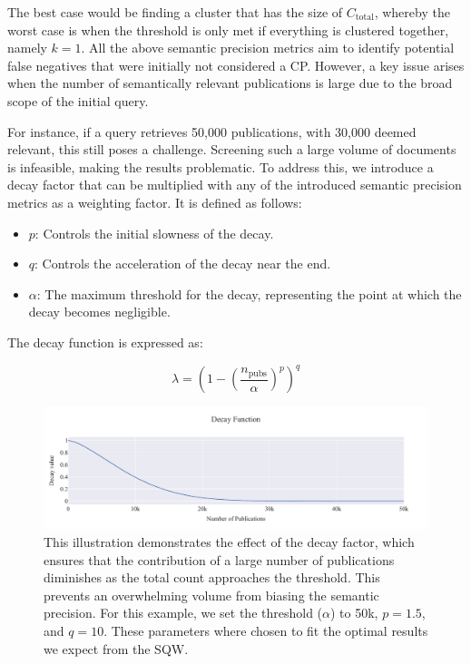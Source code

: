 The best case would be finding a cluster that has the size of \( C_{\text{total}} \), whereby the worst case is when the threshold is only met if everything is clustered together, namely $k=1$.
All the above semantic precision metrics aim to identify potential false negatives that were initially not considered a CP. However, a key issue arises when the number of semantically relevant publications is large due to the broad scope of the initial query.

For instance, if a query retrieves 50,000 publications, with 30,000 deemed relevant, this still poses a challenge. Screening such a large volume of documents is infeasible, making the results problematic. To address this, we introduce a decay factor that can be multiplied with any of the introduced semantic precision metrics as a weighting factor. It is defined as follows:

\begin{itemize}
	\item \( p \): Controls the initial slowness of the decay.
	\item \( q \): Controls the acceleration of the decay near the end.
	\item $\alpha$: The maximum threshold for the decay, representing the point at which the decay becomes negligible.
\end{itemize}

The decay function is expressed as:

\[
\lambda = \left(1 - \left(\frac{n_{\text{pubs}}}{\alpha}\right)^p\right)^q
\]


\begin{figure}[h!]
	\hspace*{-1cm}
	\includegraphics[scale=0.45]{pics/decay_function.pdf}
	\caption[Decay Function for Semantic Precision]{This illustration demonstrates the effect of the decay factor, which ensures that the contribution of a large number of publications diminishes as the total count approaches the threshold. This prevents an overwhelming volume from biasing the semantic precision. For this example, we set the threshold (\( \alpha \)) to 50k, \( p=1.5 \), and \( q=10 \). These parameters where chosen to fit the optimal results we expect from the SQW.}	
	\label{fig:decay-function}
\end{figure}

